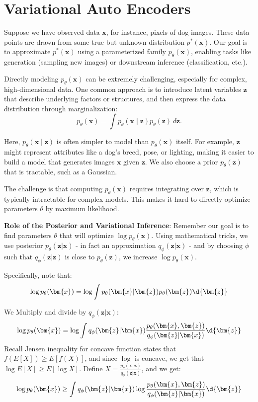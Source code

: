 \documentclass{article}
\begin{document}
\section{Variational Auto Encoders}
\begin{remark}[Motivation] Suppose we have observed data \(\mathbf{x}\), for instance, pixels of dog images. These data points are drawn from some true but unknown distribution \(p^{\ast}(\mathbf{x})\). Our goal is to approximate $p ^{\ast}(\bm{x})$ using a parameterized family \(p_{\theta}(\mathbf{x})\), enabling tasks like generation (sampling new images) or downstream inference (classification, etc.).

Directly modeling \(p_{\theta}(\mathbf{x})\) can be extremely challenging, especially for complex, high-dimensional data. One common approach is to introduce latent variables \(\mathbf{z}\) that describe underlying factors or structures, and then express the data distribution through marginalization:
\[
p_{\theta}(\mathbf{x}) = \int p_{\theta}(\mathbf{x} \mid \mathbf{z}) p_{\theta}(\mathbf{z})\,d\mathbf{z}.
\]

Here, \(p_{\theta}(\mathbf{x}\mid\mathbf{z})\) is often simpler to model than \(p_{\theta}(\mathbf{x})\) itself. For example, \(\mathbf{z}\) might represent attributes like a dog's breed, pose, or lighting, making it easier to build a model that generates images \(\mathbf{x}\) given \(\mathbf{z}\). We also choose a prior \(p_{\theta}(\mathbf{z})\) that is tractable, such as a Gaussian.

The challenge is that computing \(p_{\theta}(\mathbf{x})\) requires integrating over \(\mathbf{z}\), which is typically intractable for complex models. This makes it hard to directly optimize parameters \(\theta\) by maximum likelihood.

\textbf{Role of the Posterior and Variational Inference}:
  Remember our goal is to find parameters $\theta$ that will optimize $\log p_{\theta}(\bm{x})$. Using mathematical tricks, we use posterior $p_{\theta}(\bm{z} | \bm{x})$ - in fact an approximation $q_{\phi}(\bm{z} | \bm{x})$ - and by choosing $\phi$ such that $q_{\phi}( \bm{z} | \bm{z})$ is close to $p_{\theta}(\bm{z})$, we increase $\log p_{\theta}(\bm{x})$. 

Specifically, note that:
\[
  \log p_{\theta}(\bm{x}) = \log \int p_{\theta}(\bm{x} | \bm{z}) p_{\theta}(\bm{z}) \d{\bm{z}}
\]

We Multiply and divide by  $q_{\phi}(\bm{z} | \bm{x})$:
\[
  \log p_{\theta}(\bm{x}) = \log \int q_{\phi}(\bm{z} | \bm{x}) \frac{ p_{\theta}(\bm{x}, \bm{z})}{q_{\phi}(\bm{z} | \bm{x})} \d{\bm{z}}
\]
Recall Jensen inequality for concave function states that $f(E[X]) \geq E[f(X)]$, and since $\log$ is concave, we get that $\log E[X] \geq E [\log X]$. Define $X = \frac{p_{\theta}(\bm{x}, \bm{z})}{q_{\phi}(\bm{z} | \bm{x})}$, and we get:
\[
  \log p_{\theta}(\bm{x}) \geq \int q_{\phi}(\bm{z} | \bm{x}) \log \frac{p_{\theta}(\bm{x}, \bm{z})}{q_{\phi}(\bm{z} | \bm{x})} \d{\bm{z}}
\]


\end{remark}
\end{document}

